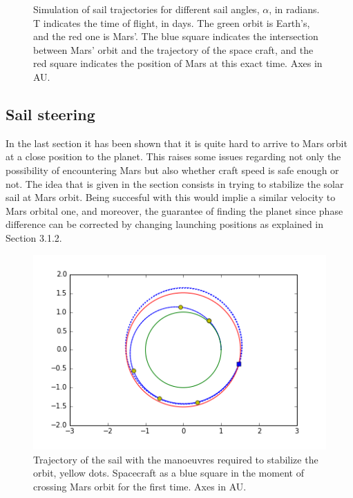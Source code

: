 \documentclass[twocolumn,12pt,a4paper]{article}
\numberwithin{equation}{section}
\begin{document}
\begin{figure}
	\caption{Simulation of sail trajectories for different sail angles, $\alpha$, in radians. T indicates the time of flight, in days. The green orbit is Earth's, and the red one is Mars'. The blue square indicates the intersection between Mars' orbit and the trajectory of the space craft, and the red square indicates the position of Mars at this exact time. Axes in AU.}
	\label{fig:espirals}
\end{figure}
\subsection{Sail steering}
In the last section it has been shown that it is quite hard to arrive to Mars orbit at a close position to the planet. This raises some issues regarding not only the possibility of encountering Mars but also whether craft speed is safe enough or not. The idea that is given in the section consists in trying to stabilize the solar sail at Mars orbit. Being succesful with this would implie a similar velocity to Mars orbital one, and moreover, the guarantee of finding the planet since phase difference can be corrected by changing launching positions as explained in Section 3.1.2. 
\begin{figure}
	\centering
	\label{fig:maniobres}
	\includegraphics[scale=0.4]{Maniobres.png}
	\caption{Trajectory of the sail with the manoeuvres required to stabilize the orbit, yellow dots. Spacecraft as a blue square in the moment of crossing Mars orbit for the first time. Axes in AU.}
\end{figure}
\end{document}
